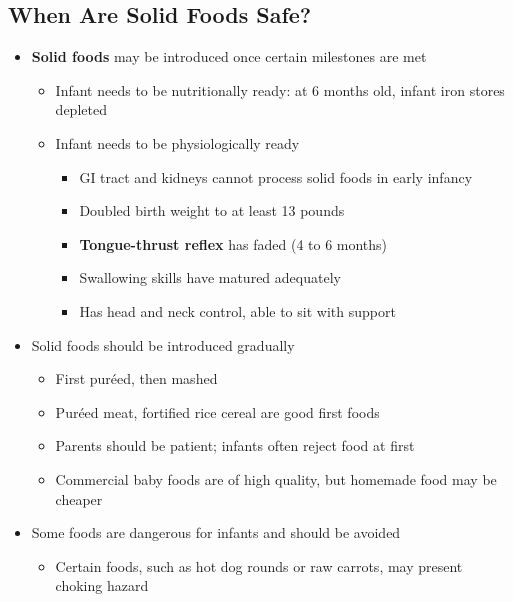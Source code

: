 \documentclass[12pt]{article}
\begin{document}
        \subsection{When Are Solid Foods Safe?}
            \begin{itemize}
                \item \textbf{Solid foods} may be introduced once certain milestones are met
                    \begin{itemize}
                        \item Infant needs to be nutritionally ready: at 6 months old, infant iron stores depleted
                        \item Infant needs to be physiologically ready
                            \begin{itemize}
                                \item GI tract and kidneys cannot process solid foods in early infancy
                                \item Doubled birth weight to at least 13 pounds
                                \item \textbf{Tongue-thrust reflex} has faded (4 to 6 months)
                                \item Swallowing skills have matured adequately
                                \item Has head and neck control, able to sit with support
                            \end{itemize}
                    \end{itemize}
                \item Solid foods should be introduced gradually
                    \begin{itemize}
                        \item First puréed, then mashed
                        \item Puréed meat, fortified rice cereal are good first foods
                        \item Parents should be patient; infants often reject food at first
                        \item Commercial baby foods are of high quality, but homemade food may be cheaper
                    \end{itemize}
                \item Some foods are dangerous for infants and should be avoided
                    \begin{itemize}
                        \item Certain foods, such as hot dog rounds or raw carrots, may present choking hazard

\end{itemize}
\end{itemize}
\end{document}
